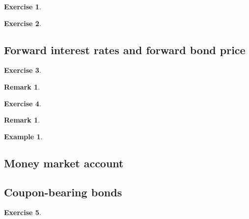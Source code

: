 \documentclass[a4paper, lualatex, ja=standard]{bxjsarticle}
\theoremstyle{theorem}
\theoremstyle{definition}
\newtheorem{rem}[thm]{Remark}
\newtheorem{expl}[thm]{Example}
\newtheorem{excs}{Exercise}[section]
\begin{document}
\begin{excs}
\end{excs}
\begin{excs}
\end{excs}

\subsection{Forward interest rates and forward bond price}
\begin{excs}
\end{excs}

\begin{rem}
\end{rem}

\begin{excs}
\end{excs}

\begin{rem}
\end{rem}

\begin{expl}
\end{expl}

\subsection{Money market account}

\subsection{Coupon-bearing bonds}
\begin{excs}
\end{excs}
\end{document}
